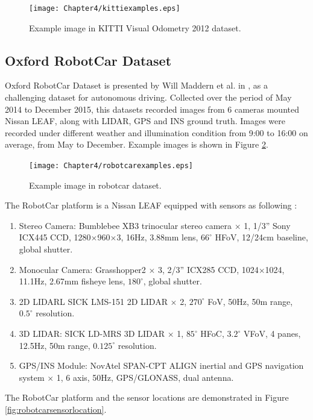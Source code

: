 \begin{figure}[H]
	\centering
	\texttt{[image: Chapter4/kittiexamples.eps]}
	\caption{Example image in KITTI Visual Odometry 2012 dataset.}
	\label{fig:kittiexamples} 
\end{figure}

\subsection{Oxford RobotCar Dataset}
Oxford RobotCar Dataset is presented by Will Maddern et al. in \cite{maddern20171}, as a challenging dataset for autonomous driving. Collected over the period of May 2014 to December 2015, this datasets recorded images from 6 cameras mounted Nissan LEAF, along with LIDAR, GPS and INS ground truth. Images were recorded under different weather and illumination condition  from 9:00 to 16:00 on average, from May to December. Example images is shown in Figure \ref{fig:robotcarexamples}.

\begin{figure}[H]
	\centering
	\texttt{[image: Chapter4/robotcarexamples.eps]}
	\caption{Example image in robotcar dataset.}
	\label{fig:robotcarexamples} 
\end{figure}

The RobotCar platform is a Nissan LEAF equipped with sensors as following \cite{maddern20171}:

\begin{enumerate}
	\item Stereo Camera: Bumblebee XB3 trinocular stereo camera $\times$ 1, 1/3'' Sony ICX445 CCD, 1280$\times$960$\times$3, 16Hz, 3.88mm lens, $66^{\circ}$ HFoV, 12/24cm baseline, global shutter.
	\item Monocular Camera: Grasshopper2 $\times$ 3, 2/3'' ICX285 CCD, 1024$\times$1024, 11.1Hz, 2.67mm fisheye lens, $180^{\circ}$, global shutter.
	\item 2D LIDARL SICK LMS-151 2D LIDAR $\times$ 2, $270^{\circ}$ FoV, 50Hz, 50m range, $0.5^{\circ}$ resolution.
	\item 3D LIDAR: SICK LD-MRS 3D LIDAR $\times$ 1, $85^{\circ}$ HFoC, $3.2^{\circ}$ VFoV, 4 panes, 12.5Hz, 50m range, $0.125^{\circ}$ resolution.
	\item GPS/INS Module: NovAtel SPAN-CPT ALIGN inertial and GPS navigation system $\times$ 1, 6 axis, 50Hz, GPS/GLONASS, dual antenna.
 \end{enumerate}

The RobotCar platform and the sensor locations are demonstrated in Figure \ref{fig:robotcarsensorlocation}.

